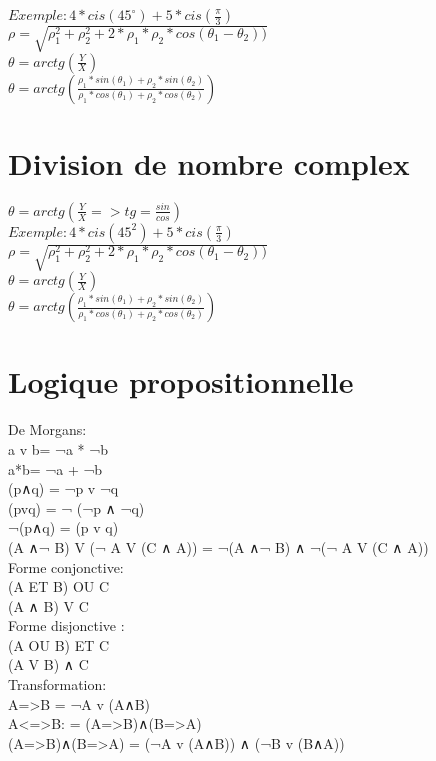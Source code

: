 $ Exemple : 4*cis(45^{\circ}) + 5*cis(\frac{\pi}{3})$\\

$\rho = \sqrt{\rho_1^{2}+\rho_2^{2} + 2 * \rho_1 * \rho_2 * cos(\theta_1-\theta_2))}$ \\

$\theta = arctg(\frac{Y}{X})$\\

$\theta = arctg(\frac{\rho_1 * sin(\theta_1) + \rho_2 * sin(\theta_2)} {\rho_1 * cos(\theta_1) + \rho_2 * cos(\theta_2)})$ \\


\vspace{4mm} %
\section{Division de nombre complex}

$\theta = arctg(\frac{Y}{X} => tg = \frac{sin}{cos} )$ \\

$ Exemple : 4*cis(45^{2}) + 5*cis(\frac{\pi}{3})$\\

$\rho = \sqrt{\rho_1^{2}+\rho_2^{2} + 2 * \rho_1 * \rho_2 * cos(\theta_1-\theta_2))}$ \\

$\theta = arctg(\frac{Y}{X})$\\

$\theta = arctg(\frac{\rho_1 * sin(\theta_1) + \rho_2 * sin(\theta_2)} {\rho_1 * cos(\theta_1) + \rho_2 * cos(\theta_2)})$ \\

\section{Logique propositionnelle}

\vspace{5mm} %
De Morgans: \\
a v b= ¬a * ¬b\\
a*b= ¬a + ¬b\\
(p∧q) = ¬p v ¬q  \\
(pvq) = ¬ (¬p ∧ ¬q)  \\
¬(p∧q) = (p v q)  \\
(A ∧¬ B) V (¬ A V (C ∧ A)) =  ¬(A ∧¬ B) ∧ ¬(¬ A V (C ∧ A))\\

\vspace{5mm} %
Forme conjonctive: \\
(A ET B) OU C \\
(A ∧ B) V C\\

\vspace{5mm} %
Forme disjonctive : \\
(A OU B) ET C \\
(A V B) ∧ C\\

\vspace{5mm} %
Transformation: \\
A=>B = ¬A v (A∧B) \\
A<=>B: = (A=>B)∧(B=>A)  \\
(A=>B)∧(B=>A) = (¬A v (A∧B)) ∧ (¬B v (B∧A))
